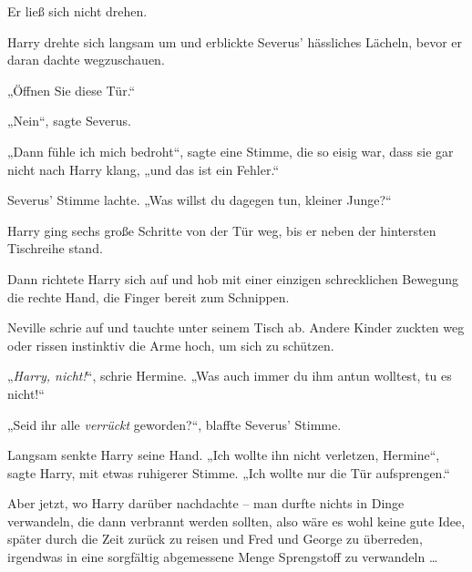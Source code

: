 Er ließ sich nicht drehen.

Harry drehte sich langsam um und erblickte Severus’ hässliches Lächeln, bevor er daran dachte wegzuschauen.

„Öffnen Sie diese Tür.“

„Nein“, sagte Severus.

„Dann fühle ich mich bedroht“, sagte eine Stimme, die so eisig war, dass sie gar nicht nach Harry klang, „und das ist ein Fehler.“

Severus’ Stimme lachte. „Was willst du dagegen tun, kleiner Junge?“

Harry ging sechs große Schritte von der Tür weg, bis er neben der hintersten Tischreihe stand.

Dann richtete Harry sich auf und hob mit einer einzigen schrecklichen Bewegung die rechte Hand, die Finger bereit zum Schnippen.

Neville schrie auf und tauchte unter seinem Tisch ab. Andere Kinder zuckten weg oder rissen instinktiv die Arme hoch, um sich zu schützen.

„\emph{Harry, nicht!}“, schrie Hermine. „Was auch immer du ihm antun wolltest, tu es nicht!“

„Seid ihr alle \emph{verrückt} geworden?“, blaffte Severus’ Stimme.

Langsam senkte Harry seine Hand. „Ich wollte ihn nicht verletzen, Hermine“, sagte Harry, mit etwas ruhigerer Stimme. „Ich wollte nur die Tür aufsprengen.“

Aber jetzt, wo Harry darüber nachdachte – man durfte nichts in Dinge verwandeln, die dann verbrannt werden sollten, also wäre es wohl keine gute Idee, später durch die Zeit zurück zu reisen und Fred und George zu überreden, irgendwas in eine sorgfältig abgemessene Menge Sprengstoff zu verwandeln …

